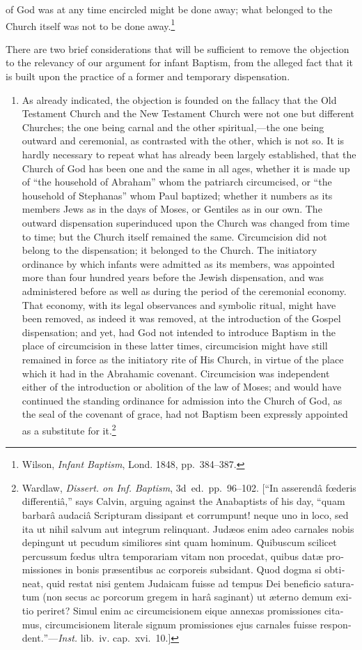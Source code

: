 \documentclass[
  english,
]{book}
\providecommand{\tightlist}{%
  \setlength{\itemsep}{0pt}\setlength{\parskip}{0pt}}
\providecommand{\textlatin}{}
\renewcommand{\textlatin}[2][]{\foreignlanguage{latin}{#2}}
\begin{document}
of God was at any time encircled might be done away; what belonged to the Church itself was not to be done away.\footnote{Wilson, \emph{Infant Baptism}, Lond. 1848, pp.~384--387.}

There are two brief considerations that will be sufficient to remove the objection to the relevancy of our argument for infant Baptism, from the alleged fact that it is built upon the practice of a former and temporary dispensation.

\begin{enumerate}
\def\labelenumi{\arabic{enumi}.}
\tightlist
\item
  As already indicated, the objection is founded on the fallacy that the Old Testament Church and the New Testament Church were not one but different Churches; the one being carnal and the other spiritual,---the one being outward and ceremonial, as contrasted with the other, which is not so. It is hardly necessary to repeat what has already been largely established, that the Church of God has been one and the same in all ages, whether it is made up of ``the household of Abraham'' whom the patriarch circumcised, or ``the household of Stephanas'' whom Paul baptized; whether it numbers as its members Jews as in the days of Moses, or Gentiles as in our own. The outward dispensation superinduced upon the Church was changed from time to time; but the Church itself remained the same. Circumcision did not belong to the dispensation; it belonged to the Church. The initiatory ordinance by which infants were admitted as its members, was appointed more than four hundred years before the Jewish dispensation, and was administered before as well as during the period of the ceremonial economy. That economy, with its legal observances and symbolic ritual, might have been removed, as indeed it was removed, at the introduction of the Gospel dispensation; and yet, had God not intended to introduce Baptism in the place of circumcision in these latter times, circumcision might have still remained in force as the initiatory rite of His Church, in virtue of the place which it had in the Abrahamic covenant. Circumcision was independent either of the introduction or abolition of the law of Moses; and would have continued the standing ordinance for admission into the Church of God, as the seal of the covenant of grace, had not Baptism been expressly appointed as a substitute for it.\footnote{Wardlaw, \emph{Dissert. on Inf. Baptism}, 3d~ed.~pp.~96--102. {[}``\textlatin{In asserendâ fœderis differentiâ},'' says Calvin, arguing against the Anabaptists of his day, ``\textlatin{quam barbarâ audaciâ Scripturam dissipant et corrumpunt! neque uno in loco, sed ita ut nihil salvum aut integrum relinquant. Judæos enim adeo carnales nobis depingunt ut pecudum similiores sint quam hominum. Quibuscum scilicet percussum fœdus ultra temporariam vitam non procedat, quibus datæ promissiones in bonis præsentibus ac corporeis subsidant. Quod dogma si obtineat, quid restat nisi gentem Judaicam fuisse ad tempus Dei beneficio saturatum (non secus ac porcorum gregem in harâ saginant) ut æterno demum exitio periret? Simul enim ac circumcisionem eique annexas promissiones citamus, circumcisionem literale signum promissiones ejus carnales fuisse respondent.}''---\emph{Inst.} lib.~iv. cap.~xvi.~10.{]}}

\end{enumerate}
\end{document}
